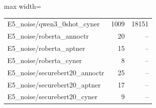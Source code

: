 \begin{table}[t]
\begin{adjustbox}{max width=\textwidth}
\begin{tabular}{lrr}
E5\_noise/qwen3\_0shot\_cyner & 1009 & 18151 \\
E5\_noise/roberta\_annoctr & 20 & -- \\
E5\_noise/roberta\_aptner & 15 & -- \\
E5\_noise/roberta\_cyner & 8 & -- \\
E5\_noise/securebert20\_annoctr & 25 & -- \\
E5\_noise/securebert20\_aptner & 17 & -- \\
E5\_noise/securebert20\_cyner & 9 & -- \\
\bottomrule
\end{tabular}
\end{adjustbox}
\end{table}